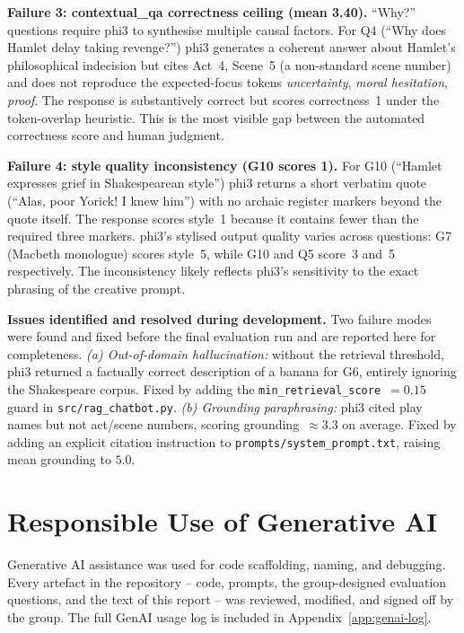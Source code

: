 \documentclass[10pt,conference]{IEEEtran}
\begin{document}
\textbf{Failure 3: contextual\_qa correctness ceiling (mean 3.40).}
``Why?'' questions require phi3 to synthesise multiple causal factors.
For Q4 (``Why does Hamlet delay taking revenge?'') phi3 generates a
coherent answer about Hamlet's philosophical indecision but cites
Act~4, Scene~5 (a non-standard scene number) and does not reproduce
the expected-focus tokens \emph{uncertainty}, \emph{moral hesitation},
\emph{proof}. The response is substantively correct but scores
correctness~1 under the token-overlap heuristic. This is the most
visible gap between the automated correctness score and human judgment.

\textbf{Failure 4: style quality inconsistency (G10 scores 1).}
For G10 (``Hamlet expresses grief in Shakespearean style'') phi3
returns a short verbatim quote
(``Alas, poor Yorick! I knew him'') with no archaic register markers
beyond the quote itself. The response scores style~1 because it
contains fewer than the required three markers. phi3's stylised
output quality varies across questions: G7 (Macbeth monologue) scores
style~5, while G10 and Q5 score~3 and~5 respectively. The
inconsistency likely reflects phi3's sensitivity to the exact phrasing
of the creative prompt.

\textbf{Issues identified and resolved during development.}
Two failure modes were found and fixed before the final evaluation
run and are reported here for completeness.
\emph{(a) Out-of-domain hallucination:} without the retrieval
threshold, phi3 returned a factually correct description of a banana
for G6, entirely ignoring the Shakespeare corpus. Fixed by adding the
\texttt{min\_retrieval\_score}~$=0.15$ guard in
\verb|src/rag_chatbot.py|.
\emph{(b) Grounding paraphrasing:} phi3 cited play names but not
act/scene numbers, scoring grounding~$\approx$3.3 on average. Fixed
by adding an explicit citation instruction to
\verb|prompts/system_prompt.txt|, raising mean grounding to $5.0$.

\section{Responsible Use of Generative AI}
\label{sec:genai}


Generative AI assistance was used for code scaffolding, naming, and
debugging. Every artefact in the repository -- code, prompts, the
group-designed evaluation questions, and the text of this report --
was reviewed, modified, and signed off by the group. The full GenAI
usage log is included in Appendix~\ref{app:genai-log}.
\end{document}
